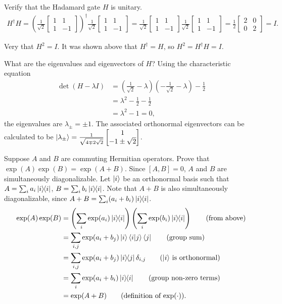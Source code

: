  Verify that the Hadamard gate $H$ is unitary.
\Soln
\begin{align*}
	H^\dagger H = \left(\frac{1}{\sqrt{2}} \begin{bmatrix}
	1 & 1 \\
	1 & -1
	\end{bmatrix}\right)^\dagger
	\frac{1}{\sqrt{2}} \begin{bmatrix}
	1 & 1 \\
	1 & -1
	\end{bmatrix}
	=
	\frac{1}{\sqrt{2}} \begin{bmatrix}
	1 & 1 \\
	1 & -1
	\end{bmatrix}
	\frac{1}{\sqrt{2}} \begin{bmatrix}
	1 & 1 \\
	1 & -1
	\end{bmatrix}
	=
	\frac{1}{2} \begin{bmatrix}
	2 & 0 \\
	0 & 2
	\end{bmatrix}
	=
	I.
\end{align*}

Very that $H^2=I$.
\Soln It was shown above that $H^\dagger=H$, so $H^2=H^\dagger H= I$.

 What are the eigenvalues and eigenvectors of $H$?
\Soln Using the characteristic equation \begin{align*}
	\det \left(H - \lambda I\right) &= \left(\frac{1}{\sqrt{2}} - \lambda \right) \left(- \frac{1}{\sqrt{2}} - \lambda \right) - \frac{1}{2}\\
		&= \lambda^2 - \frac{1}{2} - \frac{1}{2}\\
		&= \lambda^2 - 1 =0,
\end{align*}
the eigenvalues are $\lambda_\pm = \pm 1$. The associated orthonormal eigenvectors can be calculated to be $\ket{\lambda_\pm} = \frac{1}{\sqrt{4 \mp 2 \sqrt{2}}} \begin{bmatrix}
1 \\
-1 \pm \sqrt{2}
\end{bmatrix} $.




 Suppose $A$ and $B$ are commuting Hermitian operators.  Prove that $\exp(A)\exp(B)=\exp(A+B)$.
\Soln
Since $[A, B] = 0$, $A$ and $B$ are simultaneously diagonalizable. Let $\ket{i}$ be an orthonormal basis such that $A = \sum_i a_i \ket{i}\hspace{-1mm} \bra{i}$, $B = \sum_i b_i \ket{i}\hspace{-1mm} \bra{i}$.  Note that $A+B$ is also simultaneously diagonalizable, since $A+B = \sum_i (a_i+b_i)\ket{i}\hspace{-1mm} \bra{i}$.
\begin{align*}
	\exp (A) \exp (B) &= \left(\sum_i \exp (a_i) \kb{i}\right) \left(\sum_i \exp (b_i) \kb{i}\right) \tag{from above} \\
		&= \sum_{i,j} \exp (a_i + b_j) \ket{i} \braket{i | j} \bra{j} \tag{group sum}\\
		&= \sum_{i,j} \exp (a_i + b_j) \kbt{i}{j} \delta_{i, j} \tag{$\ket{i}$ is orthonormal}\\
		&= \sum_i \exp (a_i +  b_i) \kb{i}\tag{group non-zero terms}\\
		&= \exp (A+B) \tag{definition of $\exp(\cdot)$}.
\end{align*}


